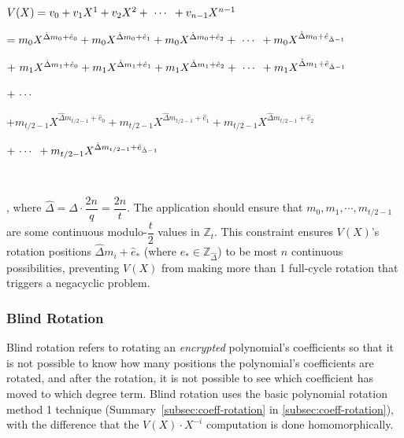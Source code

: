 \begin{tcolorbox}[title={\textbf{\tboxlabel{\ref*{subsec:tfhe-zero-padding}} Structure of Lookup Table Polynomial $\bm{V(X)}$}}]

$ $

$V(X) = v_0 + v_1X^1 + v_2X^2 + \text{ } \text{$\cdots$} \text{ } + v_{n-1}X^{n-1}$

\text{ } $= m_0X^{\hat{\Delta} m_0 + \hat{e}_0} + m_0X^{\hat{\Delta} m_0 + \hat{e}_1} + m_0X^{\hat{\Delta} m_0 + \hat{e}_2} + \text{ } \text{$\cdots$} \text{ } + m_0X^{\hat{\Delta} m_0 + \hat{e}_{\hat{\Delta} - 1}}$

\text{ } $ + \text{ } m_1X^{\hat{\Delta} m_1 + \hat{e}_0} + m_1X^{\hat{\Delta} m_1 + \hat{e}_1} + m_1X^{\hat{\Delta} m_1 + \hat{e}_2} + \text{ } \text{$\cdots$} \text{ } + m_1X^{\hat{\Delta} m_1 + \hat{e}_{\hat{\Delta} - 1}}$

\text{ } $ + \text{ } \text{$\cdots$} \text{ } $

\text{ } $ + m_{{t}/{2} - 1}X^{\hat{\Delta} m_{{t}/{2} - 1} + \hat{e}_0} + m_{{t}/{2} - 1}X^{\hat{\Delta} m_{{t}/{2} - 1} + \hat{e}_1} + m_{{t}/{2} - 1}X^{\hat{\Delta} m_{{t}/{2} - 1} + \hat{e}_2}$

\text{ } \text{ } $ + \text{ } \text{$\cdots$} \text{ } + m_{{t}/{2} - 1}X^{\hat{\Delta} m_{{t}/{2} - 1} + \hat{e}_{\hat{\Delta} - 1}}$

$ $

\noindent , where $\hat\Delta = \Delta \cdot \dfrac{2n}{q} = \dfrac{2n}{t}$. The application should ensure that $m_0, m_1, \cdots, m_{t/2 - 1}$ are some continuous modulo-$\dfrac{t}{2}$ values in $\mathbb{Z}_t$. This constraint ensures $V(X)$'s rotation positions $\hat{\Delta} m_i + \hat {e}_{*}$ (where $e_* \in \mathbb{Z}_{\hat{\Delta}}$) to be most $n$ continuous possibilities, preventing $V(X)$ from making more than 1 full-cycle rotation that triggers a negacyclic problem. 


\end{tcolorbox}


\subsubsection{Blind Rotation}
\label{subsec:bootstrapping-blind-rotation} 

Blind rotation refers to rotating an \textit{encrypted} polynomial's coefficients so that it is not possible to know how many positions the polynomial's coefficients are rotated, and after the rotation, it is not possible to see which coefficient has moved to which degree term. Blind rotation uses the basic polynomial rotation method 1 technique (Summary~\ref*{subsec:coeff-rotation} in \autoref{subsec:coeff-rotation}), with the difference that the $V(X)\cdot X^{-i}$ computation is done homomorphically. 

